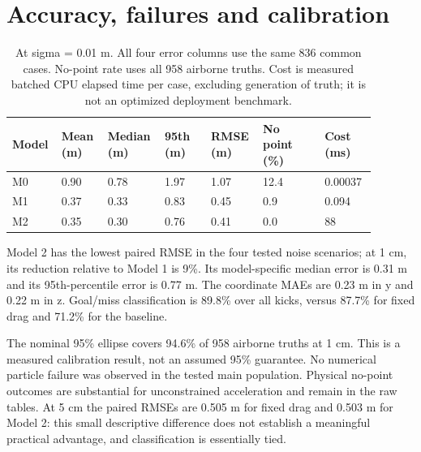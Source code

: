\documentclass[11pt,a4paper]{article}
\begin{document}
\section{Accuracy, failures and calibration}
\begin{table}[htbp]\centering\small
\setlength{\tabcolsep}{3pt}
\begin{tabular}{p{0.089\linewidth}p{0.125\linewidth}p{0.134\linewidth}p{0.125\linewidth}p{0.125\linewidth}p{0.160\linewidth}p{0.134\linewidth}}\toprule
Model & Mean (m) & Median (m) & 95th (m) & RMSE (m) & No point (\%) & Cost (ms)\\\midrule
M0 & 0.90 & 0.78 & 1.97 & 1.07 & 12.4 & 0.00037\\
M1 & 0.37 & 0.33 & 0.83 & 0.45 & 0.9 & 0.094\\
M2 & 0.35 & 0.30 & 0.76 & 0.41 & 0.0 & 88\\
\bottomrule\end{tabular}
\caption{At sigma = 0.01 m. All four error columns use the same 836 common cases. No-point rate uses all 958 airborne truths. Cost is measured batched CPU elapsed time per case, excluding generation of truth; it is not an optimized deployment benchmark.}
\end{table}
Model 2 has the lowest paired RMSE in the four tested noise scenarios; at 1 cm, its reduction relative to Model 1 is 9\%. Its model-specific median error is 0.31 m and its 95th-percentile error is 0.77 m. The coordinate MAEs are 0.23 m in y and 0.22 m in z. Goal/miss classification is 89.8\% over all kicks, versus 87.7\% for fixed drag and 71.2\% for the baseline.

The nominal 95\% ellipse covers 94.6\% of 958 airborne truths at 1 cm. This is a measured calibration result, not an assumed 95\% guarantee. No numerical particle failure was observed in the tested main population. Physical no-point outcomes are substantial for unconstrained acceleration and remain in the raw tables. At 5 cm the paired RMSEs are 0.505 m for fixed drag and 0.503 m for Model 2: this small descriptive difference does not establish a meaningful practical advantage, and classification is essentially tied.
\end{document}
